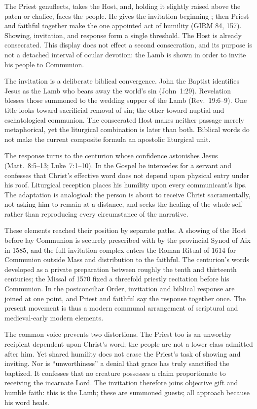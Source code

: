 The Priest genuflects, takes the Host, and, holding it slightly raised above the paten or chalice, faces the people. He gives the invitation beginning ; then Priest and faithful together make the one appointed act of humility (GIRM 84, 157). Showing, invitation, and response form a single threshold. The Host is already consecrated. This display does not effect a second consecration, and its purpose is not a detached interval of ocular devotion: the Lamb is shown in order to invite his people to Communion.

The invitation is a deliberate biblical convergence. John the Baptist identifies Jesus as the Lamb who bears away the world's sin (John~1:29). Revelation blesses those summoned to the wedding supper of the Lamb (Rev.~19:6--9). One title looks toward sacrificial removal of sin; the other toward nuptial and eschatological communion. The consecrated Host makes neither passage merely metaphorical, yet the liturgical combination is later than both. Biblical words do not make the current composite formula an apostolic liturgical unit.

The response turns to the centurion whose confidence astonishes Jesus (Matt.~8:5--13; Luke~7:1--10). In the Gospel he intercedes for a servant and confesses that Christ's effective word does not depend upon physical entry under his roof. Liturgical reception places his humility upon every communicant's lips. The adaptation is analogical: the person is about to receive Christ sacramentally, not asking him to remain at a distance, and seeks the healing of the whole self rather than reproducing every circumstance of the narrative.

These elements reached their position by separate paths. A showing of the Host before lay Communion is securely prescribed with  by the provincial Synod of Aix in 1585, and the full invitation complex enters the Roman Ritual of 1614 for Communion outside Mass and distribution to the faithful. The centurion's words developed as a private preparation between roughly the tenth and thirteenth centuries; the Missal of 1570 fixed a threefold priestly recitation before his Communion. In the postconciliar Order, invitation and biblical response are joined at one point, and Priest and faithful say the response together once. The present movement is thus a modern communal arrangement of scriptural and medieval-early modern elements.

The common voice prevents two distortions. The Priest too is an unworthy recipient dependent upon Christ's word; the people are not a lower class admitted after him. Yet shared humility does not erase the Priest's task of showing and inviting. Nor is ``unworthiness'' a denial that grace has truly sanctified the baptized. It confesses that no creature possesses a claim proportionate to receiving the incarnate Lord. The invitation therefore joins objective gift and humble faith: this is the Lamb; these are summoned guests; all approach because his word heals.

